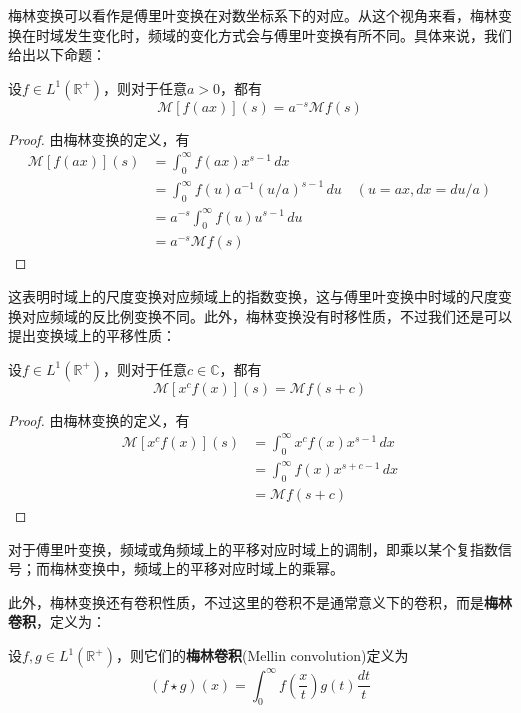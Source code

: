 \documentclass{ctexbook}
\begin{document}
梅林变换可以看作是傅里叶变换在对数坐标系下的对应。从这个视角来看，梅林变换在时域发生变化时，频域的变化方式会与傅里叶变换有所不同。具体来说，我们给出以下命题：
\begin{proposition}[梅林变换的尺度变换性质]
    设$f\in L^1(\mathbb{R}^+)$，则对于任意$a>0$，都有
    \[\mathcal{M} [f(ax)](s)=a^{-s}\mathcal{M} f(s)\]
\end{proposition}
\begin{proof}
    由梅林变换的定义，有
    \begin{align*}
        \mathcal{M} [f(ax)](s)&=\int_0^{\infty}f(ax)x^{s-1}\,dx\\
        &=\int_0^{\infty}f(u)a^{-1}(u/a)^{s-1}\,du\quad (u=ax,dx=du/a)\\
        &=a^{-s}\int_0^{\infty}f(u)u^{s-1}\,du\\
        &=a^{-s}\mathcal{M} f(s)
    \end{align*}
\end{proof}

这表明时域上的尺度变换对应频域上的指数变换，这与傅里叶变换中时域的尺度变换对应频域的反比例变换不同。此外，梅林变换没有时移性质，不过我们还是可以提出变换域上的平移性质：

\begin{proposition}[梅林变换的乘幂性质]
    设$f\in L^1(\mathbb{R}^+)$，则对于任意$c\in\mathbb{C}$，都有
    \[\mathcal{M} [x^c f(x)](s)=\mathcal{M} f(s+c)\]
\end{proposition}
\begin{proof}
    由梅林变换的定义，有
    \begin{align*}
        \mathcal{M} [x^c f(x)](s)&=\int_0^{\infty}x^c f(x)x^{s-1}\,dx\\
        &=\int_0^{\infty}f(x)x^{s+c-1}\,dx\\
        &=\mathcal{M} f(s+c)
    \end{align*}
\end{proof}

对于傅里叶变换，频域或角频域上的平移对应时域上的调制，即乘以某个复指数信号；而梅林变换中，频域上的平移对应时域上的乘幂。

此外，梅林变换还有卷积性质，不过这里的卷积不是通常意义下的卷积，而是\textbf{梅林卷积}，定义为：
\begin{definition}[梅林卷积]
    设$f,g\in L^1(\mathbb{R}^+)$，则它们的\textbf{梅林卷积}(Mellin convolution)定义为
    \[(f\star g)(x)=\int_0^{\infty}f\left(\frac{x}{t}\right)g(t)\frac{dt}{t}\]
\end{definition}
\end{document}
